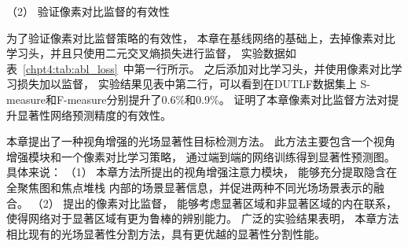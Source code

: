 （2）
验证像素对比监督的有效性

为了验证像素对比监督策略的有效性，
本章在基线网络的基础上，去掉像素对比学习头，并且只使用二元交叉熵损失进行监督，
实验数据如表~\ref{chpt4:tab:abl_loss}~中第一行所示。
之后添加对比学习头，并使用像素对比学习损失加以监督，
实验结果见表中第二行，可以看到在DUTLF数据集上
S-measure和F-measure分别提升了0.6\%和0.9\%。
证明了本章像素对比监督方法对提升显著性网络预测精度的有效性。








本章提出了一种视角增强的光场显著性目标检测方法。
此方法主要包含一个视角增强模块和一个像素对比学习策略，
通过端到端的网络训练得到显著性预测图。
具体来说：
（1）
本章方法所提出的视角增强注意力模块，
能够充分提取隐含在全聚焦图和焦点堆栈
内部的场景显著信息，并促进两种不同光场场景表示的融合。
（2）
提出的像素对比监督，
能够考虑显著区域和非显著区域的内在联系，
使得网络对于显著区域有更为鲁棒的辨别能力。
广泛的实验结果表明，
本章方法相比现有的光场显著性分割方法，具有更优越的显著性分割性能。








